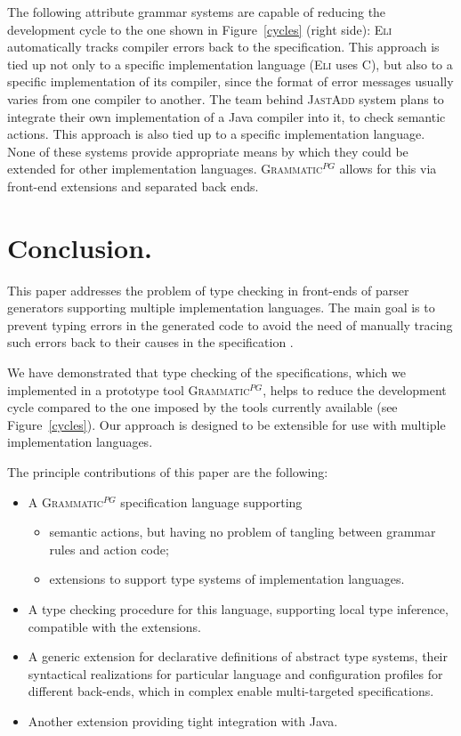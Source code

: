 \documentclass{informat} %
\newcommand{\figref}[1]{Figure~\ref{#1}}
\newcommand{\tool}[1]{\textsc{#1}}
\newcommand{\ATF}{\textsc{Grammatic}$^{PG}$}
\begin{document}
The following attribute grammar systems are capable of reducing the development cycle to the one shown in \figref{cycles} (right side): \tool{Eli} \cite{Eli} automatically tracks compiler errors back to the specification. This approach is tied up not only to a specific implementation language (\tool{Eli} uses C), but also to a specific implementation of its compiler, since the format of error messages usually varies from one compiler to another.
The team behind \tool{JastAdd} \cite{JastAdd} system plans to integrate their own implementation of a Java compiler into it, to check semantic actions. This approach is also tied up to a specific implementation language. None of these systems provide appropriate means by which they could be extended for other implementation languages. \ATF{} allows for this via front-end extensions and separated back ends.


\section{Conclusion.}\label{Conclusion}

This paper addresses the problem of type checking in front-ends of parser generators supporting multiple implementation languages. The main goal is to prevent typing errors in the generated code to avoid the need of manually tracing such errors back to their causes in the specification . 

We have demonstrated that type checking of the specifications, which we implemented in a prototype tool \ATF{}, helps to reduce the development cycle compared to the one imposed by the tools currently available (see \figref{cycles}). Our approach is designed to be extensible for use with multiple implementation languages.

The principle contributions of this paper are the following:
\begin{itemize}
	\item A \ATF{} specification language supporting 
		\begin{itemize}
			\item semantic actions, but having no problem of tangling between grammar rules and action code;
			\item extensions to support type systems of implementation languages.
		\end{itemize}
	\item A type checking procedure for this language, supporting local type inference, compatible with the extensions.
	\item A generic extension for declarative definitions of abstract type systems, their syntactical realizations for particular language and configuration profiles for different back-ends, which in complex enable multi-targeted specifications.
	\item Another extension providing tight integration with Java.
\end{itemize}
\end{document}
